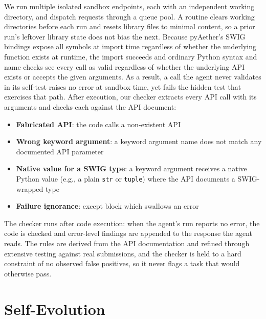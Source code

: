 \documentclass[conference]{IEEEtran}
\begin{document}
We run multiple isolated sandbox endpoints, each with an independent working directory, and dispatch requests through a queue pool. A routine clears working directories before each run and resets library files to minimal content, so a prior run's leftover library state does not bias the next.
Because pyAether's SWIG bindings expose all symbols at import time regardless of whether the underlying function exists at runtime, the import succeeds and ordinary Python syntax and name checks see every call as valid regardless of whether the underlying API exists or accepts the given arguments. As a result, a call the agent never validates in its self-test raises no error at sandbox time, yet fails the hidden test that exercises that path. After execution, our checker extracts every API call with its arguments and checks each against the API document:
\begin{itemize}
\item \textbf{Fabricated API}: the code calls a non-existent API
\item \textbf{Wrong keyword argument}: a keyword argument name does not match any documented API parameter
\item \textbf{Native value for a SWIG type}: a keyword argument receives a native Python value (e.g., a plain \texttt{str} or \texttt{tuple}) where the API documents a SWIG-wrapped type
\item \textbf{Failure ignorance}: except block which swallows an error
\end{itemize}
The checker runs after code execution: when the agent's run reports no
error, the code is checked and error-level findings are appended to the
response the agent reads. The rules are derived from the API documentation
and refined through extensive testing against real submissions, and the
checker is held to a hard constraint of no observed false positives, so it never flags a
task that would otherwise pass.


\section{Self-Evolution}
\label{sec:selfev}
\end{document}

